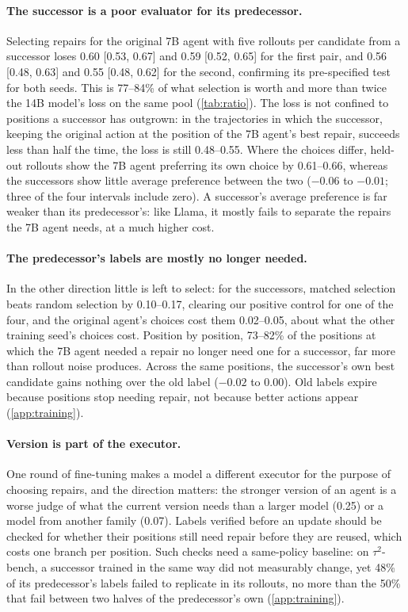 \documentclass{article}
\newcommand{\tautwo}{$\tau^2$-bench}
\theoremstyle{plain}
\theoremstyle{definition}
\theoremstyle{remark}
\begin{document}
\paragraph{The successor is a poor evaluator for its predecessor.}
Selecting repairs for the original 7B agent with five rollouts per candidate from a successor loses 0.60 [0.53, 0.67] and 0.59 [0.52, 0.65] for the first pair, and 0.56 [0.48, 0.63] and 0.55 [0.48, 0.62] for the second, confirming its pre-specified test for both seeds. This is 77--84\% of what selection is worth and more than twice the 14B model's loss on the same pool (\cref{tab:ratio}). The loss is not confined to positions a successor has outgrown: in the trajectories in which the successor, keeping the original action at the position of the 7B agent's best repair, succeeds less than half the time, the loss is still 0.48--0.55. Where the choices differ, held-out rollouts show the 7B agent preferring its own choice by 0.61--0.66, whereas the successors show little average preference between the two ($-0.06$ to $-0.01$; three of the four intervals include zero). A successor's average preference is far weaker than its predecessor's: like Llama, it mostly fails to separate the repairs the 7B agent needs, at a much higher cost.

\paragraph{The predecessor's labels are mostly no longer needed.}
In the other direction little is left to select: for the successors, matched selection beats random selection by 0.10--0.17, clearing our positive control for one of the four, and the original agent's choices cost them 0.02--0.05, about what the other training seed's choices cost. Position by position, 73--82\% of the positions at which the 7B agent needed a repair no longer need one for a successor, far more than rollout noise produces. Across the same positions, the successor's own best candidate gains nothing over the old label ($-0.02$ to 0.00). Old labels expire because positions stop needing repair, not because better actions appear (\cref{app:training}).

\paragraph{Version is part of the executor.}
One round of fine-tuning makes a model a different executor for the purpose of choosing repairs, and the direction matters: the stronger version of an agent is a worse judge of what the current version needs than a larger model (0.25) or a model from another family (0.07). Labels verified before an update should be checked for whether their positions still need repair before they are reused, which costs one branch per position. Such checks need a same-policy baseline: on \tautwo{}, a successor trained in the same way did not measurably change, yet 48\% of its predecessor's labels failed to replicate in its rollouts, no more than the 50\% that fail between two halves of the predecessor's own (\cref{app:training}).
\end{document}

